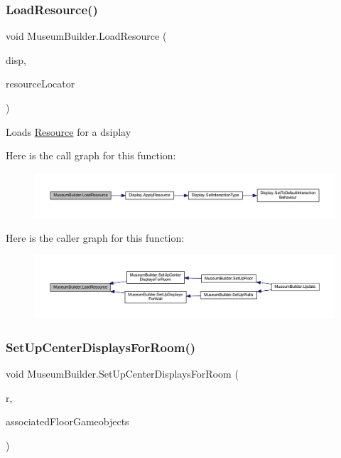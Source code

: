 \subsubsection{\texorpdfstring{Load\+Resource()}{LoadResource()}}
{\footnotesize\ttfamily void Museum\+Builder.\+Load\+Resource (\begin{DoxyParamCaption}\item[{\mbox{\hyperlink{class_display}{Display}}}]{disp,  }\item[{string}]{resource\+Locator }\end{DoxyParamCaption})\hspace{0.3cm}{\ttfamily [private]}}



Loads \mbox{\hyperlink{class_resource}{Resource}} for a dsiplay 

Here is the call graph for this function\+:
\nopagebreak
\begin{figure}[H]
\begin{center}
\leavevmode
\includegraphics[width=350pt]{class_museum_builder_a2c456481ed3350f0113041111d63d0ec_cgraph}
\end{center}
\end{figure}
Here is the caller graph for this function\+:
\nopagebreak
\begin{figure}[H]
\begin{center}
\leavevmode
\includegraphics[width=350pt]{class_museum_builder_a2c456481ed3350f0113041111d63d0ec_icgraph}
\end{center}
\end{figure}
\mbox{\label{class_museum_builder_a159e037415aaf348d5a0af9561be8560}} 
\subsubsection{\texorpdfstring{Set\+Up\+Center\+Displays\+For\+Room()}{SetUpCenterDisplaysForRoom()}}
{\footnotesize\ttfamily void Museum\+Builder.\+Set\+Up\+Center\+Displays\+For\+Room (\begin{DoxyParamCaption}\item[{\mbox{\hyperlink{class_room}{Room}}}]{r,  }\item[{List$<$ Game\+Object $>$}]{associated\+Floor\+Gameobjects }\end{DoxyParamCaption})\hspace{0.3cm}{\ttfamily [private]}}



